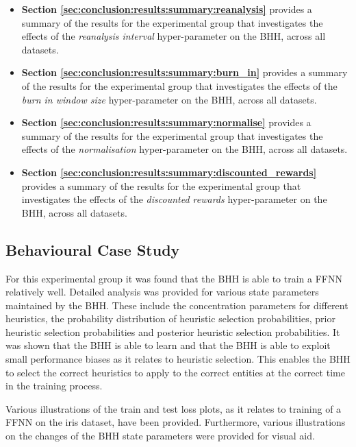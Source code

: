 \begin{itemize}
      \item \textbf{Section \ref{sec:conclusion:results:summary:reanalysis}} provides a summary of the results for the experimental group that investigates the effects of the \textit{reanalysis interval} hyper-parameter on the \acs{BHH}, across all datasets.

      \item \textbf{Section \ref{sec:conclusion:results:summary:burn_in}} provides a summary of the results for the experimental group that investigates the effects of the \textit{burn in window size} hyper-parameter on the \acs{BHH}, across all datasets.

      \item \textbf{Section \ref{sec:conclusion:results:summary:normalise}} provides a summary of the results for the experimental group that investigates the effects of the \textit{normalisation} hyper-parameter on the \acs{BHH}, across all datasets.

      \item \textbf{Section \ref{sec:conclusion:results:summary:discounted_rewards}} provides a summary of the results for the experimental group that investigates the effects of the \textit{discounted rewards} hyper-parameter on the \acs{BHH}, across all datasets.
\end{itemize}

\subsection{Behavioural Case Study}
\label{sec:conclusion:results:summary:case_study}

For this experimental group it was found that the \ac{BHH} is able to train a \acf{FFNN} relatively well. Detailed analysis was provided for various state parameters maintained by the \acs{BHH}. These include the concentration parameters for different heuristics, the probability distribution of heuristic selection probabilities, prior heuristic selection probabilities and posterior heuristic selection probabilities. It was shown that the \ac{BHH} is able to learn and that the \acs{BHH} is able to exploit small performance biases as it relates to heuristic selection. This enables the \acs{BHH} to select the correct heuristics to apply to the correct entities at the correct time in the training process.

Various illustrations of the train and test loss plots, as it relates to training of a \acs{FFNN} on the iris dataset, have been provided. Furthermore, various illustrations on the changes of the \acs{BHH} state parameters were provided for visual aid.

